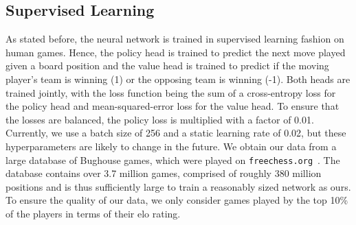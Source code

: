 \subsection{Supervised Learning}
\label{subsec:sl}
As stated before, the neural network is trained in supervised learning fashion on human games.
Hence, the policy head is trained to predict the next move played given a board position and the value head is trained to predict if the moving player's team is winning (1) or the opposing team is winning (-1).
Both heads are trained jointly, with the loss function being the sum of a cross-entropy loss for the policy head and mean-squared-error loss for the value head.
To ensure that the losses are balanced, the policy loss is multiplied with a factor of 0.01.
Currently, we use a batch size of 256 and a static learning rate of 0.02, but these hyperparameters are likely to change in the future.
We obtain our data from a large database of Bughouse games\cite{bughouseDatabase}, which were played on \texttt{freechess.org}~\cite{freechess}.
The database contains over 3.7 million games, comprised of roughly 380 million positions and is thus sufficiently large to train a reasonably sized network as ours.
To ensure the quality of our data, we only consider games played by the top 10\% of the players in terms of their elo rating.
